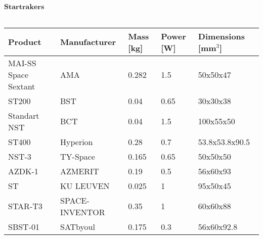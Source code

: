 		      
		      $\textbf{Startrakers}$\\ \\
		      \begin{tabular}{p{3cm}p{3cm}p{2cm}p{2cm}p{2cm}} \toprule
		      	Product & Manufacturer & Mass [kg] & Power [W]& Dimensions [mm$^{3}$]\\ \midrule
		      	
		      	MAI-SS Space Sextant & AMA & 0.282 & 1.5 & 50x50x47 \\
		      	
		      	ST200 & BST & 0.04 & 0.65 & 30x30x38 \\
		      	
		      	Standart NST & BCT & 0.04 & 1.5 & 100x55x50 \\
		      	
		      	ST400 & Hyperion & 0.28 & 0.7 & 53.8x53.8x90.5\\
		      	
		      NST-3 & TY-Space & 0.165 & 0.65 & 50x50x50 \\
		      	
		      	AZDK-1 & AZMERIT & 0.19 & 0.5 & 56x60x93 \\
		      	
		      	ST & KU LEUVEN & 0.025 & 1 & 95x50x45 \\
		      	
		      	STAR-T3 & SPACE-INVENTOR & 0.35 & 1 & 60x60x88 \\
		      	
		      	SBST-01 & SATbyoul & 0.175 & 0.3 & 56x60x92.8\\  \bottomrule
		      \end{tabular}\\ \\ \\ \\
		      
